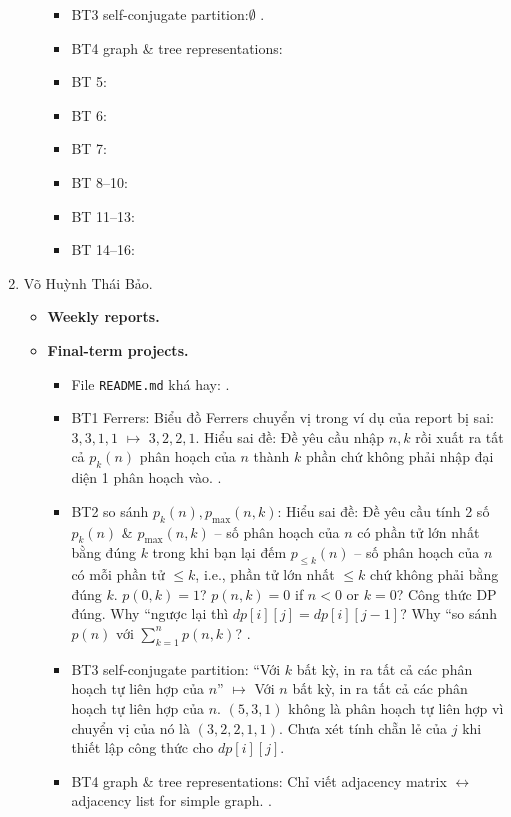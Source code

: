 \documentclass{article}
\begin{document}
\begin{enumerate}
\begin{itemize}
\begin{itemize}
            \item BT3 self-conjugate partition:$\emptyset$ .
            \item BT4 graph \& tree representations:
            \item BT 5:
            \item BT 6:
            \item BT 7:
            \item BT 8--10:
            \item BT 11--13:
            \item BT 14--16:
        \end{itemize}
    \end{itemize}
    \item {\sc Võ Huỳnh Thái Bảo.}
    \begin{itemize}
        \item {\bf Weekly reports.}
        \item {\bf Final-term projects.}
        \begin{itemize}
            \item File {\tt README.md} khá hay: .
            \item BT1 Ferrers: Biểu đồ Ferrers chuyển vị trong ví dụ của report bị sai: \st{$3,3,1,1$} $\mapsto$ $3,2,2,1$. Hiểu sai đề: Đề yêu cầu nhập $n,k$ rồi xuất ra tất cả $p_k(n)$ phân hoạch của $n$ thành $k$ phần chứ không phải nhập đại diện 1 phân hoạch vào. .
            \item BT2 so sánh $p_k(n),p_{\max}(n,k)$:  Hiểu sai đề: Đề yêu cầu tính 2 số $p_k(n)$ \& $p_{\max}(n,k)$ -- số phân hoạch của $n$ có phần tử lớn nhất bằng đúng $k$ trong khi bạn lại đếm $p_{\le k}(n)$ -- số phân hoạch của $n$ có mỗi phần tử $\le k$, i.e., phần tử lớn nhất $\le k$ chứ không phải bằng đúng $k$. $p(0,k) = 1$? $p(n,k) = 0$ if $n < 0$ or $k = 0$? Công thức DP đúng. Why ``ngược lại thì $dp[i][j] = dp[i][j - 1]$? Why ``so sánh $p(n)$ với $\sum_{k=1}^n p(n,k)$? .
            \item BT3 self-conjugate partition: ``Với \st{$k$} bất kỳ, in ra tất cả các phân hoạch tự liên hợp của $n$'' $\mapsto$ Với $n$ bất kỳ, in ra tất cả các phân hoạch tự liên hợp của $n$. $(5,3,1)$ không là phân hoạch tự liên hợp vì chuyển vị của nó là $(3,2,2,1,1)$. Chưa xét tính chẵn lẻ của $j$ khi thiết lập công thức cho $dp[i][j]$.
            \item BT4 graph \& tree representations: Chỉ viết adjacency matrix $\leftrightarrow$ adjacency list for simple graph. .

\end{itemize}
\end{itemize}
\end{enumerate}
\end{document}
